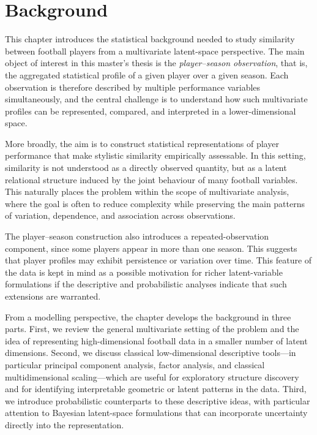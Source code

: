 \chapter{Background}
\label{chap:background}

This chapter introduces the statistical background needed to study similarity between football players from a multivariate latent-space perspective. The main object of interest in this master's thesis is the \emph{player--season observation}, that is, the aggregated statistical profile of a given player over a given season. Each observation is therefore described by multiple performance variables simultaneously, and the central challenge is to understand how such multivariate profiles can be represented, compared, and interpreted in a lower-dimensional space.

More broadly, the aim is to construct statistical representations of player performance that make stylistic similarity empirically assessable. In this setting, similarity is not understood as a directly observed quantity, but as a latent relational structure induced by the joint behaviour of many football variables. This naturally places the problem within the scope of multivariate analysis, where the goal is often to reduce complexity while preserving the main patterns of variation, dependence, and association across observations.

The player--season construction also introduces a repeated-observation component, since some players appear in more than one season. This suggests that player profiles may exhibit persistence or variation over time. This feature of the data is kept in mind as a possible motivation for richer latent-variable formulations if the descriptive and probabilistic analyses indicate that such extensions are warranted. 

From a modelling perspective, the chapter develops the background in three parts. First, we review the general multivariate setting of the problem and the idea of representing high-dimensional football data in a smaller number of latent dimensions. Second, we discuss classical low-dimensional descriptive tools---in particular principal component analysis, factor analysis, and classical multidimensional scaling---which are useful for exploratory structure discovery and for identifying interpretable geometric or latent patterns in the data. Third, we introduce probabilistic counterparts to these descriptive ideas, with particular attention to Bayesian latent-space formulations that can incorporate uncertainty directly into the representation.


